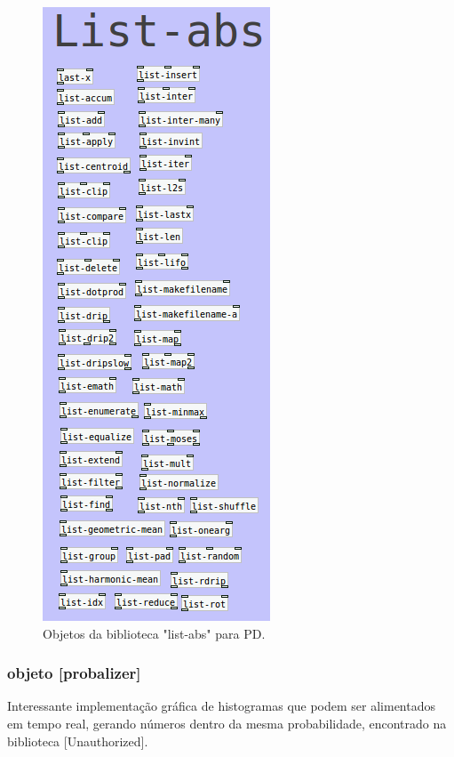 \documentclass[
	12pt,				%
	openright,			%
	twoside,			%
	a4paper,			%
	english,			%
	french,				%
	spanish,			%
	brazil				%
	]{abntex2}
\begin{document}
\begin{figure}[!h]
	\caption{\label{fig_grafico}Objetos da biblioteca "list-abs" para PD.}
	\begin{center}
	    \includegraphics[scale=0.7]{OMPD/PD-list-abs.png}
	\end{center}
\end{figure}



\subsubsection{objeto [probalizer]}

Interessante implementação gráfica de histogramas que podem ser alimentados em tempo real, gerando números dentro da mesma probabilidade, encontrado na biblioteca [Unauthorized].
\end{document}
